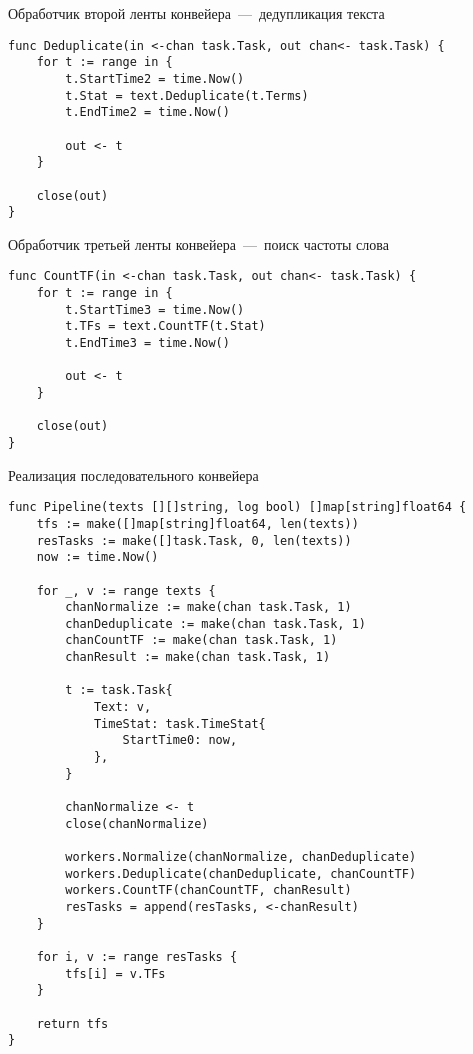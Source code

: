\newpage

\begin{code}
\caption{Обработчик второй ленты конвейера~---~дедупликация текста}
\label{code:5}
\begin{verbatim}
func Deduplicate(in <-chan task.Task, out chan<- task.Task) {
	for t := range in {
		t.StartTime2 = time.Now()
		t.Stat = text.Deduplicate(t.Terms)
		t.EndTime2 = time.Now()
		
		out <- t
	}
	
	close(out)
}
\end{verbatim}
\end{code}

\begin{code}
\caption{Обработчик третьей ленты конвейера~---~поиск частоты слова}
\label{code:6}
\begin{verbatim}
func CountTF(in <-chan task.Task, out chan<- task.Task) {
	for t := range in {
		t.StartTime3 = time.Now()
		t.TFs = text.CountTF(t.Stat)
		t.EndTime3 = time.Now()
		
		out <- t
	}

	close(out)
}
\end{verbatim}
\end{code}

\newpage

\begin{code}
\caption{Реализация последовательного конвейера}
\label{code:7}
\begin{verbatim}
func Pipeline(texts [][]string, log bool) []map[string]float64 {
	tfs := make([]map[string]float64, len(texts))
	resTasks := make([]task.Task, 0, len(texts))
	now := time.Now()
	
	for _, v := range texts {
		chanNormalize := make(chan task.Task, 1)
		chanDeduplicate := make(chan task.Task, 1)
		chanCountTF := make(chan task.Task, 1)
		chanResult := make(chan task.Task, 1)
		
		t := task.Task{
			Text: v,
			TimeStat: task.TimeStat{
				StartTime0: now,
			},
		}
		
		chanNormalize <- t
		close(chanNormalize)
		
		workers.Normalize(chanNormalize, chanDeduplicate)
		workers.Deduplicate(chanDeduplicate, chanCountTF)
		workers.CountTF(chanCountTF, chanResult)
		resTasks = append(resTasks, <-chanResult)
	}
	
	for i, v := range resTasks {
		tfs[i] = v.TFs
	}
	
	return tfs
}
\end{verbatim}
\end{code}

